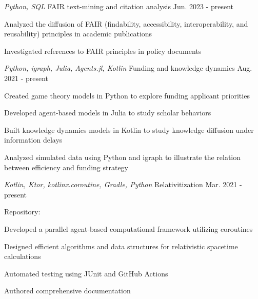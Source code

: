 

\begin{cventries}

  \cventry
    {\emph{Python, SQL}} %
    {FAIR text-mining and citation analysis} %
    {} %
    {Jun. 2023 - present} %
    {
      \begin{cvitems} %
        \item{Analyzed the diffusion of FAIR (findability, accessibility, interoperability, and reusability) principles in academic publications}
        \item{Investigated references to FAIR principles in policy documents}
      \end{cvitems}
    }

  \cventry
    {\emph{Python, igraph, Julia, Agents.jl, Kotlin}} %
    {Funding and knowledge dynamics} %
    {} %
    {Aug. 2021 - present} %
    {
      \begin{cvitems} %
        \item{Created game theory models in Python to explore funding applicant priorities}
        \item{Developed agent-based models in Julia to study scholar behaviors}
        \item{Built knowledge dynamics models in Kotlin to study knowledge diffusion under information delays}
        \item{Analyzed simulated data using Python and igraph to illustrate the relation between efficiency and funding strategy}
      \end{cvitems}
    }

  \cventry
    {\emph{Kotlin, Ktor, kotlinx.coroutine, Gradle, Python}} %
    {Relativitization} %
    {} %
    {Mar. 2021 - present} %
    {
      \begin{cvitems} %
        \item{Repository: \href{https://github.com/adriankhl/relativitization}{\underline{}}}
        \item{Developed a parallel agent-based computational framework utilizing coroutines}
        \item{Designed efficient algorithms and data structures for relativistic spacetime calculations}
        \item{Automated testing using JUnit and GitHub Actions}
        \item{Authored comprehensive documentation}
      \end{cvitems}
    }


\end{cventries}
